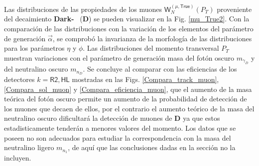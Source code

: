 Las distribuciones de las propiedades de los muones $\textsf{W}^{(\mu,\textsf{True})}_N (P_T)$ proveniente del decaimiento  \textbf{Dark-}\SUSY ~ (\MSSM\textbf{D}) 
se pueden visualizar en la Fig. \ref{mu_True2}. Con la comparación de las distribuciones con la variación de los elementos del parámetro de generación $\vec{\alpha}$, se comprobó la invarianza de la morfología de las distribuciones para los parámetros $\eta$ y $\phi$. Las distribuciones del momento transversal $P_T$ muestran variaciones con el parámetro de generación masa del fotón oscuro $m_{\gamma_D}$ y del neutralino oscuro $m_{n_D}$. Se concluye al comparar con las eficiencias de los detectores $k=\textsf{R2}, \textsf{HL}$ mostradas en las Figs. \ref{Compara_track_muon}, \ref{Compara_sol_muon} y \ref{Compara_eficiencia_muon}, que el aumento de la masa teórica del fotón oscuro permite un aumento de la probabilidad de detección de los muones que decaen de ellos, por el contrario el aumento teórico de la masa del neutralino oscuro dificultará la detección de muones de \MSSM\textbf{D} ya que estos estadisticamente tenderán a menores valores del momento. Los datos que se poseen no son adecuados para estudiar la correspondencia con la masa del neutralino ligero $m_{n_1}$, de aquí que las conclusiones dadas en la sección no la incluyen.




